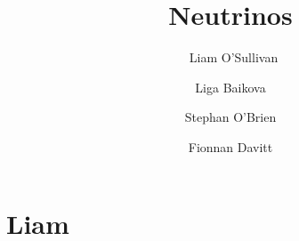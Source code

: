 \documentclass[10pt]{report}
\title{Neutrinos}
\author{\
    Liam O'Sullivan \and
    Liga Baikova \and
    Stephan O'Brien \and
    Fionnan Davitt
}
\begin{document}
\maketitle

\tableofcontents

\chapter{Liam}






\end{document}
